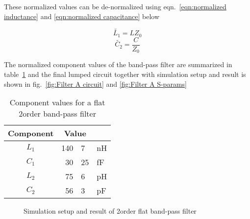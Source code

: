 \documentclass[report.tex]{subfiles}
\begin{document}
These normalized values can be de-normalized using eqn.~\ref{eqn:normalized inductance} and \ref{eqn:normalized capacitance} below

\begin{equation}
    \label{eqn:normalized inductance}
    \tilde{L_1}=L Z_0
\end{equation}
\begin{equation}
    \label{eqn:normalized capacitance}
    \tilde{C_2}=\frac{C}{Z_0}
\end{equation}

The normalized component values of the band-pass filter are summarized in table~\ref{table:filter values} and the final lumped circuit together with simulation setup and result is shown in fig.~\ref{fig:Filter A circuit} and \ref{fig:Filter A S-params}

\begin{table}[h]
    \centering
    \caption{Component values for a flat 2\nd order band-pass filter}
    \begin{tabular}{c | r @{.} l @{} l}
        Component & \multicolumn{2}{c}{Value} \\
        \hline
        $L_1$     & 140&7 & nH\\
        $C_1$     & 30&25 & fF\\
        $L_2$     & 75&6  & pH\\
        $C_2$     & 56&3  & pF\\
    \end{tabular}
    \label{table:filter values}
\end{table}

\clearpage
\begin{figure}[h]
    \centering
    
    \caption{Simulation setup and result of 2\nd order flat band-pass filter}
\end{figure}
\clearpage
\end{document}

